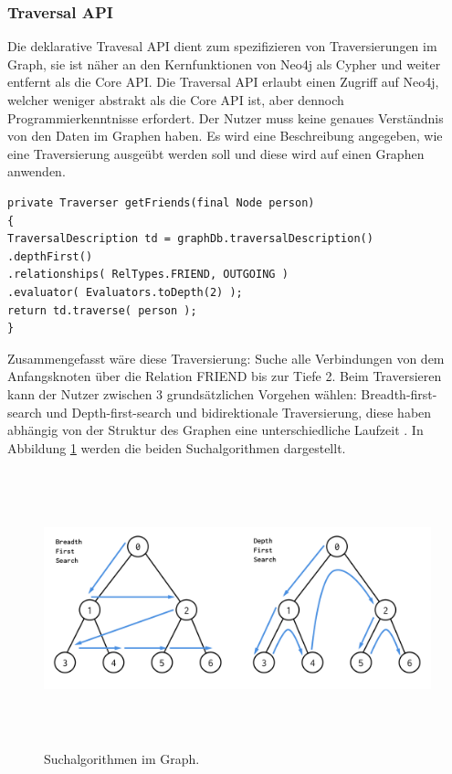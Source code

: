 \subsubsection{Traversal API}
Die deklarative Travesal API dient zum spezifizieren von Traversierungen im Graph, sie ist näher an den Kernfunktionen von Neo4j als Cypher und weiter entfernt als die Core API. Die Traversal API erlaubt einen  Zugriff auf Neo4j, welcher weniger abstrakt als die Core API ist, aber dennoch Programmierkenntnisse erfordert. Der Nutzer muss keine genaues Verständnis von den Daten im Graphen haben. Es wird eine Beschreibung angegeben, wie eine Traversierung  ausgeübt werden soll und diese wird auf einen Graphen anwenden. 
\begin{Verbatim}[frame=single]
private Traverser getFriends(final Node person)
{
TraversalDescription td = graphDb.traversalDescription()
.depthFirst()
.relationships( RelTypes.FRIEND, OUTGOING )
.evaluator( Evaluators.toDepth(2) );
return td.traverse( person );
}
\end{Verbatim}
Zusammengefasst wäre diese Traversierung: Suche alle Verbindungen von dem Anfangsknoten über die Relation FRIEND bis zur Tiefe 2.  Beim Traversieren kann der  Nutzer zwischen 3 grundsätzlichen Vorgehen wählen: Breadth-first-search und Depth-first-search und bidirektionale Traversierung, diese haben abhängig von der Struktur des Graphen eine unterschiedliche Laufzeit \parencite{vukotic2015neo4j}. In  Abbildung \ref{fig:Search} werden die beiden Suchalgorithmen dargestellt.
\begin{figure}[!htb]
	\centering
	\includegraphics [width=14cm, height=8cm]{Figures/search}
	\caption[Server]{Suchalgorithmen im Graph.}
	\label{fig:Search}
\end{figure} \newline
